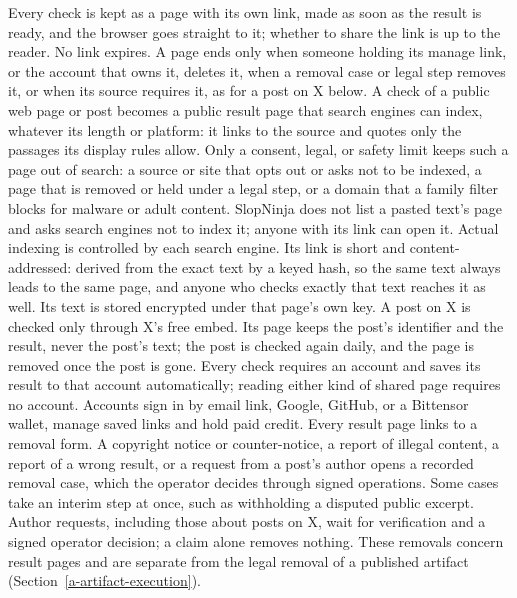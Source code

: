Every check is kept as a page with its own link, made as soon as the result is
ready, and the browser goes straight to it; whether to share the link is up to
the reader. No link expires. A page ends only when someone holding its manage
link, or the account that owns it, deletes it, when a removal case or legal
step removes it, or when its source requires it, as for a post on X below. A
check of a public web page or post becomes a public result page that search
engines can index, whatever its length or platform: it links to the
source and quotes only the passages its display rules allow. Only a consent,
legal, or safety limit keeps such a page out of search: a source or site that
opts out or asks not to be indexed, a page that is removed or held under a
legal step, or a domain that a family filter blocks for malware or adult
content. SlopNinja does not list a pasted text's page and asks search engines
not to index it; anyone with its link can open it. Actual indexing is controlled
by each search engine. Its link is short and content-addressed: derived from
the exact text by a keyed hash, so the same text always leads to the same page,
and anyone who checks exactly that text reaches it as well. Its text is stored
encrypted under that page's own key. A post on X is checked only through X's
free embed. Its page keeps the post's identifier and the result, never the
post's text; the post is checked again daily, and the page is removed once the
post is gone. Every check requires an account and saves its result to that
account automatically; reading either kind of shared page requires no account.
Accounts sign in by email link, Google, GitHub, or a Bittensor wallet, manage
saved links and hold paid credit. Every result page links to a removal form. A copyright notice or
counter-notice, a report of illegal content, a report of a wrong result, or a request from a post's author opens a recorded
removal case, which the operator decides through signed
operations. Some cases take an interim step at once, such as withholding a
disputed public excerpt. Author requests, including those about posts on X,
wait for verification and a signed operator decision; a claim alone removes
nothing.
These removals concern result pages and are separate from the legal removal of
a published artifact (Section~\ref{a-artifact-execution}).

